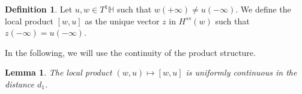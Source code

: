 \documentclass[a4paper,english,reqno]{amsart}
\DeclareMathOperator{\reals}{\mathbb{R}}
\renewcommand{\H}{\mathbb{H}}
\newcommand{\N}{\mathbb{N}} %
\newtheorem{lemma}{Lemma}
\newtheorem{proposition}{Proposition}
\theoremstyle{definition}
\newtheorem{definition}[theorem]{Definition}
\numberwithin{equation}{section}
\begin{document}
%

%	
%	
%	


\begin{definition}
	Let $u,w\in T^1 \H$ such that $w(+\infty)\not = u(-\infty)$. We define the local product $[w,u]$ as the unique vector $z$ in $H^{ss}(w)$ such that $z(-\infty)= u(-\infty)$. 
\end{definition}

In the following, we will use the continuity of the product structure.

\begin{lemma}\label{cont_localprod} \cite{KatokHasselblatt1995}
	The local product $(w,u)\mapsto [w,u]$ is uniformly continuous in the distance $d_1$. 
\end{lemma}
\end{document}
